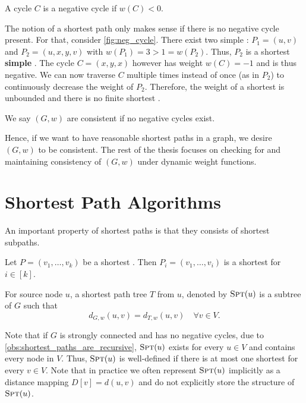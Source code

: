 \begin{definition} 
  A cycle $C$ is a negative cycle if $w(C) < 0$.
\end{definition}

\noindent The notion of a shortest path only makes sense if there is no negative cycle present.
For that, consider \cref{fig:neg_cycle}. 
There exist two simple : $P_1 = (u, v)$ and $P_2 = (u, x, y, v)$ with $w(P_1) = 3 > 1 = w(P_2)$.
Thus, $P_2$ is a shortest \textbf{simple} .
The cycle $C = (x, y, x)$ however has weight $w(C) = -1$ and is thus negative.
We can now traverse $C$ multiple times instead of once (as in $P_2$) to continuously decrease the weight of $P_2$.
Therefore, the weight of a shortest  is unbounded and there is no finite shortest .

\begin{definition}
  We say $(G, w)$ are consistent if no negative cycles exist.
\end{definition}

\noindent Hence, if we want to have reasonable shortest paths in a graph, we desire $(G,w)$ to be consistent.
The rest of the thesis focuses on checking for and maintaining consistency of $(G,w)$ under dynamic weight functions.


\section{Shortest Path Algorithms}
An important property of shortest paths is that they consists of shortest subpaths.

\begin{observation}\label{obs:shortest_paths_are_recursive}
  Let $P = (v_1, \ldots, v_k)$ be a shortest .
  Then $P_i = (v_1, \ldots, v_i)$ is a shortest  for $i \in [k]$.
\end{observation}

\begin{definition}\label{def:shortest_path_tree}
  For source node $u$, a shortest path tree $T$ from $u$, denoted by $\textsc{Spt}(u)$ is a subtree of $G$ such that \[
    d_{G, w}(u, v) = d_{T, w}(u, v) \quad\forall v \in V.
  \]  
\end{definition}

\noindent Note that if $G$ is strongly connected and has no negative cycles, due to \cref{obs:shortest_paths_are_recursive}, $\textsc{Spt}(u)$ exists for every $u \in V$ and contains every node in $V$.
Thus, $\textsc{Spt}(u)$ is well-defined if there is at most one shortest  for every $v \in V$.
Note that in practice we often represent $\textsc{Spt}(u)$ implicitly as a distance mapping $D[v] = d(u, v)$ and do not explicitly store the structure of $\textsc{Spt}(u)$. 

